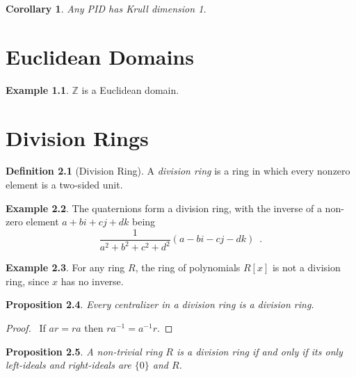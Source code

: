\documentclass{book}
\let\qed\relax
\newtheorem{prop}{Proposition}[chapter]
\newtheorem{cor}{Corollary}[prop]
\theoremstyle{definition}
\newtheorem{df}[prop]{Definition}
\newtheorem{ex}[prop]{Example}
\newcommand{\inv}[1]{\ensuremath{{#1}^{-1}}}
\begin{document}
\begin{cor}
Any PID has Krull dimension 1.
\end{cor}

\chapter{Euclidean Domains}


\begin{ex}
$\mathbb{Z}$ is a Euclidean domain.
\end{ex}

\chapter{Division Rings}

\begin{df}[Division Ring]
A \emph{division ring} is a ring in which every nonzero element is a two-sided unit.
\end{df}

\begin{ex}
The quaternions form a division ring, with the inverse of a non-zero element $a + bi + cj + dk$ being
\[ \frac{1}{a^2 + b^2 + c^2 + d^2} (a - bi - cj - dk) \enspace . \]
\end{ex}

\begin{ex}
For any ring $R$, the ring of polynomials $R[x]$ is not a division ring, since $x$ has no inverse.
\end{ex}

\begin{prop}
Every centralizer in a division ring is a division ring.
\end{prop}

\begin{proof}
\pf\ If $ar = ra$ then $r\inv{a} = \inv{a}r$. \qed
\end{proof}

\begin{prop}
\label{prop:division-ring-ideals}
A non-trivial ring $R$ is a division ring if and only if its only left-ideals and right-ideals are $\{0\}$ and $R$.
\end{prop}
\end{document}
